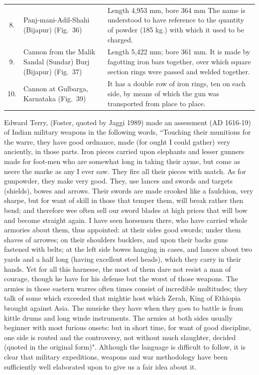 {{\begin{longtable}{|c|p{3.5cm}|p{5cm}|}
8. & Panj-mani-Adil-Shahi  (Bijapur) (Fig.~36) & Length 4,953 mm, bore 364 mm The name is understood to have reference to the quantity of powder (185 kg.) with which it used to be charged.\\
9. & Cannon  from the Malik Sandal (Sundar) Burj (Bijapur) (Fig.~37) & Length 5,422 mm; bore 361 mm. It is made by fagotting iron bars together, over which square section rings were passed and welded together.\\
10. & Cannon at Gulbarga, Karnataka (Fig.~39) & It has a double row of iron rings, ten on each side, by means of which the gun was transported from place to place.\\
\hline
\end{longtable}
}}


\vspace{-.3cm}

Edward Terry, (Foster, quoted by Jaggi 1989) made an assessment (AD 1616-19) of Indian military weapons in the following words, {\footnotesize{``Touching their munitions for the warre, they have good ordnance, made (for ought I could gather) very anciently, in those parts. Iron pieces carried upon elephants and lesser gunners made for foot-men who are somewhat long in taking their ayme, but come as neere the marke as any I ever saw. They fire all their pieces with match. As for gunpowder, they make very good. They, use lances and swords and targets (shields), bowes and arrows. Their swords are made crooked like a faulchion, very sharpe, but for want of skill in those that temper them, will break rather then bend; and therefore wee often sell our sword blades at high prices that will bow and become straight again. I have seen horsemen there, who have carried whole armories about them, thus appointed: at their sides good swords; under them shaves of arrowes; on their shoulders bucklers, and upon their backs guns fastened with belts; at the left side bowes hanging in cases, and lances about two yards and a half long (having excellent steel heads), which they carry in their hands. Yet for all this harnesse, the most of them dare not resist a man of courage, though he have for his defense but the worst of those weapons. The armies in those eastern warres often times consist of incre­dible multitudes; they talk of some which exceeded that mightie host which Zerah, King of Ethiopia brought against Asia. The musicke they have when they goes to battle is from kittle drums and long winde instruments. The armies at both sides usually beginner with most furious onsets: but in short time, for want of good discipline, one side is routed and the controversy, not without much slaughter, decided (quoted in the original form)".}}  Although the language is difficult to follow, it is clear that military expeditions, weapons and war methodology have been sufficiently well elaborated upon to give us a fair idea about it.

